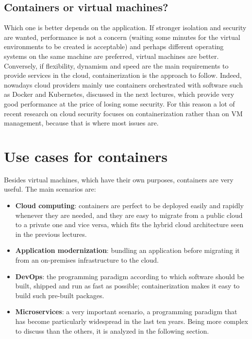 \subsection{Containers or virtual machines?}

Which one is better depends on the application. If stronger isolation and security are wanted, performance is not a concern (waiting some minutes for the virtual environments to be created is acceptable) and perhaps different operating systems on the same machine are preferred, virtual machines are better. Conversely, if flexibility, dynamism and speed are the main requirements to provide services in the cloud, containerization is the approach to follow. Indeed, nowadays cloud providers mainly use containers orchestrated with software such as Docker and Kubernetes, discussed in the next lectures, which provide very good performance at the price of losing some security. For this reason a lot of recent research on cloud security focuses on containerization rather than on VM management, because that is where most issues are.

\section{Use cases for containers}

Besides virtual machines, which have their own purposes, containers are very useful. The main scenarios are:

\begin{itemize}
\item \textbf{Cloud computing}: containers are perfect to be deployed easily and rapidly whenever they are needed, and they are easy to migrate from a public cloud to a private one and vice versa, which fits the hybrid cloud architecture seen in the previous lectures.
\item \textbf{Application modernization}: bundling an application before migrating it from an on-premises infrastructure to the cloud.
\item \textbf{DevOps}: the programming paradigm according to which software should be built, shipped and run as fast as possible; containerization makes it easy to build such pre-built packages.
\item \textbf{Microservices}: a very important scenario, a programming paradigm that has become particularly widespread in the last ten years. Being more complex to discuss than the others, it is analyzed in the following section.
\end{itemize}

